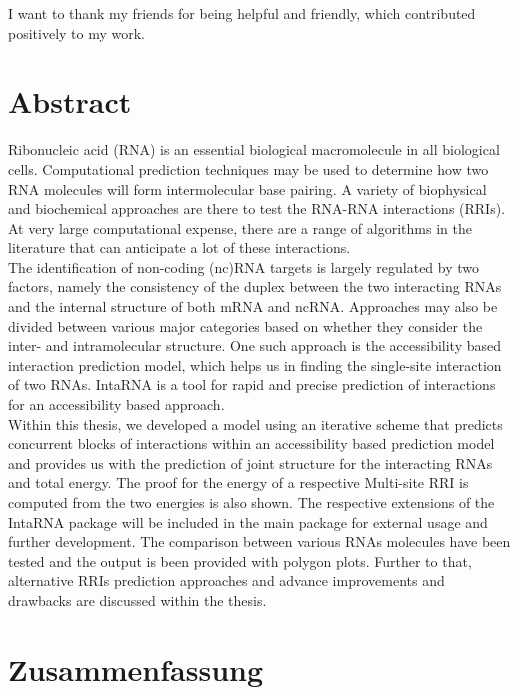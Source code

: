 \documentclass[twoside,a4paper]{report}
\numberwithin{equation}{section}
\begin{document}
I want to thank my friends for being helpful and friendly, which contributed positively to my work.
 \\


\newpage
\chapter*{Abstract}

Ribonucleic acid (RNA) is an essential biological macromolecule in all biological cells. Computational prediction techniques may be used to determine how two RNA molecules will form intermolecular base pairing. A variety of biophysical and biochemical approaches are there to test the RNA-RNA interactions (RRIs). At very large computational expense, there are a range of algorithms in the literature that can anticipate a lot of these interactions.\\

 The identification of non-coding (nc)RNA targets is largely regulated by two factors, namely the consistency of the duplex between the two interacting RNAs and the internal structure of both mRNA and ncRNA. Approaches may also be divided between various major categories based on whether they consider the inter- and intramolecular structure. One such approach is the accessibility based interaction prediction model, which helps us in finding the single-site interaction of two RNAs. IntaRNA is a tool for rapid and precise prediction of interactions for an accessibility based approach.  \\

 Within this thesis, we developed a model using an iterative scheme that predicts concurrent blocks of interactions within an accessibility based prediction model and provides us with the prediction of joint structure for the interacting RNAs and total energy. The proof for the energy of a respective Multi-site RRI is computed from the two energies is also shown. The respective extensions of the IntaRNA package will be included in the main package for external usage and further development. The comparison between various RNAs molecules have been tested and the output is been provided with polygon plots. Further to that, alternative RRIs prediction approaches and advance improvements and drawbacks are discussed within the thesis. \\



\newpage
\chapter*{Zusammenfassung}
\end{document}
